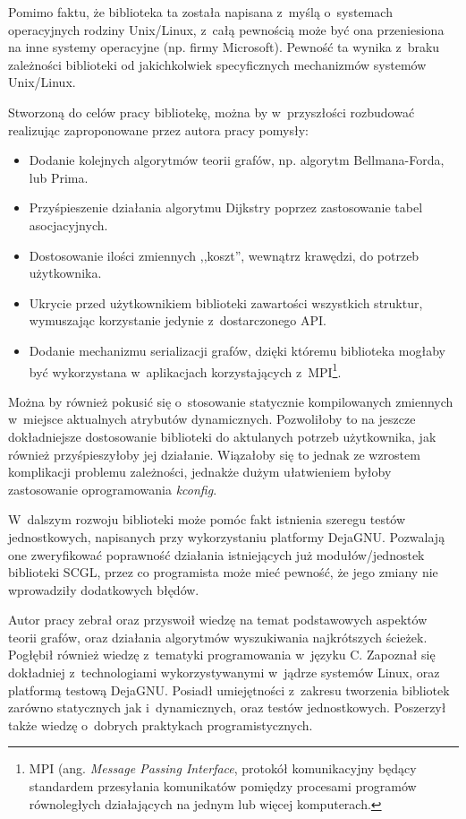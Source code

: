 \documentclass[a4paper,12pt,polish,twoside,openright]{thesis}
\begin{document}
Pomimo faktu, że biblioteka ta została napisana z~myślą o~systemach operacyjnych rodziny Unix/Linux, z~całą pewnością może być ona przeniesiona na inne systemy operacyjne (np. firmy Microsoft).
Pewność ta wynika z~braku zależności biblioteki od jakichkolwiek specyficznych mechanizmów systemów Unix/Linux.

Stworzoną do celów pracy bibliotekę, można by w~przyszłości rozbudować realizując zaproponowane przez autora pracy pomysły:
\begin{itemize}
	\item Dodanie kolejnych algorytmów teorii grafów, np. algorytm Bellmana-Forda, lub Prima.
	\item Przyśpieszenie działania algorytmu Dijkstry poprzez zastosowanie tabel asocjacyjnych.
	\item Dostosowanie ilości zmiennych ,,koszt'', wewnątrz krawędzi, do potrzeb użytkownika.
	\item Ukrycie przed użytkownikiem biblioteki zawartości wszystkich struktur, wymuszając korzystanie jedynie z~dostarczonego API.
	\item Dodanie mechanizmu serializacji grafów, dzięki któremu biblioteka mogłaby być wykorzystana w~aplikacjach korzystających z~MPI\footnote{MPI (ang. \emph{Message Passing Interface}, protokół komunikacyjny będący standardem przesyłania komunikatów pomiędzy procesami programów równoległych działających na jednym lub więcej komputerach.}.
\end{itemize}
Można by również pokusić się o~stosowanie statycznie kompilowanych zmiennych w~miejsce aktualnych atrybutów dynamicznych.
Pozwoliłoby to na jeszcze dokładniejsze dostosowanie biblioteki do aktulanych potrzeb użytkownika, jak również przyśpieszyłoby jej działanie.
Wiązałoby się to jednak ze wzrostem komplikacji problemu zależności, jednakże dużym ułatwieniem byłoby zastosowanie oprogramowania \emph{kconfig}.

W~dalszym rozwoju biblioteki może pomóc fakt istnienia szeregu testów jednostkowych, napisanych przy wykorzystaniu platformy DejaGNU. Pozwalają one zweryfikować poprawność działania istniejących już modułów/jednostek biblioteki SCGL, przez co programista może mieć pewność, że jego zmiany nie wprowadziły dodatkowych błędów.

Autor pracy zebrał oraz przyswoił wiedzę na temat podstawowych aspektów teorii grafów, oraz działania algorytmów wyszukiwania najkrótszych ścieżek.
Pogłębił również wiedzę z~tematyki programowania w~języku C.
Zapoznał się dokładniej z~technologiami wykorzystywanymi w~jądrze systemów Linux, oraz platformą testową DejaGNU.
Posiadł umiejętności z~zakresu tworzenia bibliotek zarówno statycznych jak i~dynamicznych, oraz testów jednostkowych.
Poszerzył także wiedzę o~dobrych praktykach programistycznych.
\end{document}
